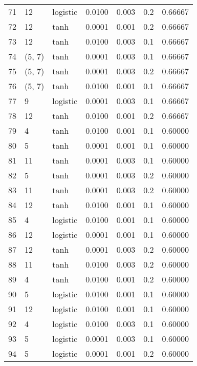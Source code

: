 \begin{tabular}{lllrrrr}
71  &          12 &  logistic &  0.0100 &  0.003 &  0.2 &   0.66667 \\
72  &          12 &      tanh &  0.0001 &  0.001 &  0.2 &   0.66667 \\
73  &          12 &      tanh &  0.0100 &  0.003 &  0.1 &   0.66667 \\
74  &      (5, 7) &      tanh &  0.0001 &  0.003 &  0.1 &   0.66667 \\
75  &      (5, 7) &      tanh &  0.0001 &  0.003 &  0.2 &   0.66667 \\
76  &      (5, 7) &      tanh &  0.0100 &  0.001 &  0.1 &   0.66667 \\
77  &           9 &  logistic &  0.0001 &  0.003 &  0.1 &   0.66667 \\
78  &          12 &      tanh &  0.0100 &  0.001 &  0.2 &   0.66667 \\
79  &           4 &      tanh &  0.0100 &  0.001 &  0.1 &   0.60000 \\
80  &           5 &      tanh &  0.0001 &  0.001 &  0.1 &   0.60000 \\
81  &          11 &      tanh &  0.0001 &  0.003 &  0.1 &   0.60000 \\
82  &           5 &      tanh &  0.0001 &  0.003 &  0.2 &   0.60000 \\
83  &          11 &      tanh &  0.0001 &  0.003 &  0.2 &   0.60000 \\
84  &          12 &      tanh &  0.0100 &  0.001 &  0.1 &   0.60000 \\
85  &           4 &  logistic &  0.0100 &  0.001 &  0.1 &   0.60000 \\
86  &          12 &  logistic &  0.0001 &  0.001 &  0.1 &   0.60000 \\
87  &          12 &      tanh &  0.0001 &  0.003 &  0.2 &   0.60000 \\
88  &          11 &      tanh &  0.0100 &  0.003 &  0.2 &   0.60000 \\
89  &           4 &      tanh &  0.0100 &  0.001 &  0.2 &   0.60000 \\
90  &           5 &  logistic &  0.0100 &  0.001 &  0.1 &   0.60000 \\
91  &          12 &  logistic &  0.0100 &  0.001 &  0.1 &   0.60000 \\
92  &           4 &  logistic &  0.0100 &  0.003 &  0.1 &   0.60000 \\
93  &           5 &  logistic &  0.0001 &  0.003 &  0.1 &   0.60000 \\
94  &           5 &  logistic &  0.0001 &  0.001 &  0.2 &   0.60000 \\

\end{tabular}
